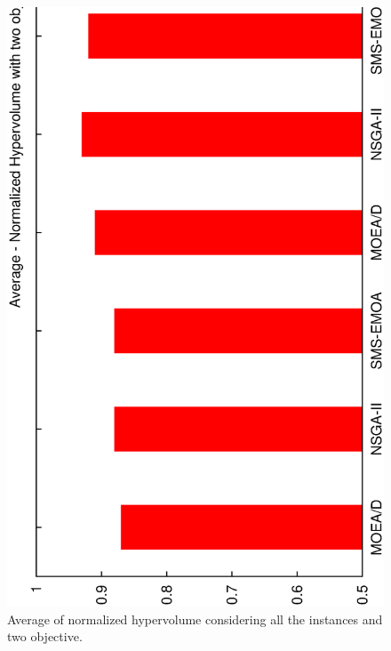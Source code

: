 \begin{figure}[!t]
\centering
\includegraphics[scale=0.25,angle=-90]{img/bar_HV_2obj.eps}
\caption{Average of normalized hypervolume considering all the instances and two objective.}
\label{fig_sim}
\end{figure}
